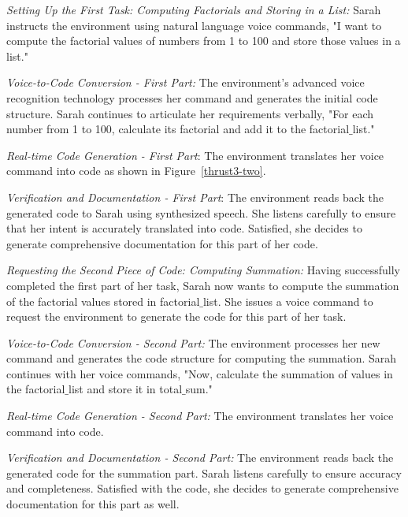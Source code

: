 {\em Setting Up the First Task: Computing Factorials and Storing in a
  List:} Sarah instructs the environment using natural language voice
commands, "I want to compute the factorial values of numbers from 1 to
100 and store those values in a list."

{\em Voice-to-Code Conversion - First Part:} The environment's
advanced voice recognition technology processes her command and
generates the initial code structure. Sarah continues to articulate
her requirements verbally, "For each number from 1 to 100, calculate
its factorial and add it to the factorial$\_$list."

{\em Real-time Code Generation - First Part}:
The environment translates her voice command into code as shown in Figure~\ref{thrust3-two}.

{\em Verification and Documentation - First Part}: The environment
reads back the generated code to Sarah using synthesized speech. She
listens carefully to ensure that her intent is accurately translated
into code. Satisfied, she decides to generate comprehensive
documentation for this part of her code.


{\em Requesting the Second Piece of Code: Computing Summation:} Having
successfully completed the first part of her task, Sarah now wants to
compute the summation of the factorial values stored in
factorial$\_$list. She issues a voice command to request the environment
to generate the code for this part of her task.

{\em Voice-to-Code Conversion - Second Part:} The environment
processes her new command and generates the code structure for
computing the summation.
Sarah continues with her voice commands, "Now, calculate the summation
of values in the factorial$\_$list and store it in total$\_$sum."

{\em Real-time Code Generation - Second Part:}
The environment translates her voice command into code.

{\em Verification and Documentation - Second Part:} The environment
reads back the generated code for the summation part. Sarah listens
carefully to ensure accuracy and completeness. Satisfied with the
code, she decides to generate comprehensive documentation for this
part as well.



